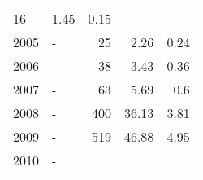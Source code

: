 \begin{longtable}{lXrrr}
       \num{16} &
       \num[round-mode=places,round-precision=2]{1,45} &
         \num[round-mode=places,round-precision=2]{0,15} \\

     2005 &
     \multicolumn{1}{X}{ -  } &


       \num{25} &
       \num[round-mode=places,round-precision=2]{2,26} &
         \num[round-mode=places,round-precision=2]{0,24} \\

     2006 &
     \multicolumn{1}{X}{ -  } &


       \num{38} &
       \num[round-mode=places,round-precision=2]{3,43} &
         \num[round-mode=places,round-precision=2]{0,36} \\

     2007 &
     \multicolumn{1}{X}{ -  } &


       \num{63} &
       \num[round-mode=places,round-precision=2]{5,69} &
         \num[round-mode=places,round-precision=2]{0,6} \\

     2008 &
     \multicolumn{1}{X}{ -  } &


       \num{400} &
       \num[round-mode=places,round-precision=2]{36,13} &
         \num[round-mode=places,round-precision=2]{3,81} \\

     2009 &
     \multicolumn{1}{X}{ -  } &


       \num{519} &
       \num[round-mode=places,round-precision=2]{46,88} &
         \num[round-mode=places,round-precision=2]{4,95} \\

     2010 &
     \multicolumn{1}{X}{ -  } &



\end{longtable}
